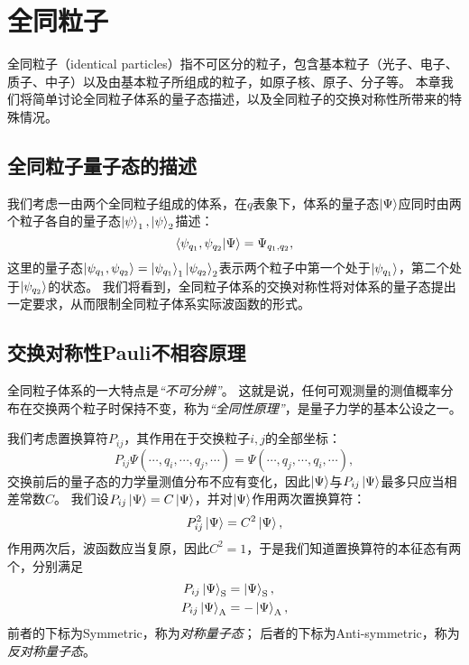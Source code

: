 
\section{全同粒子}
\label{sec:identical_particles}

全同粒子（identical particles）指不可区分的粒子，包含基本粒子（光子、电子、质子、中子）以及由基本粒子所组成的粒子，如原子核、原子、分子等。
本章我们将简单讨论全同粒子体系的量子态描述，以及全同粒子的交换对称性所带来的特殊情况。

\subsection{全同粒子量子态的描述}
\label{subsec:ip_state_desc}

我们考虑一由两个全同粒子组成的体系，在$q$表象下，体系的量子态$\ket{\Psi}$应同时由两个粒子各自的量子态$\ket{\psi}_1,\ket{\psi}_2$描述：
\begin{equation}
    \braket{\psi_{q_1},\psi_{q_2}}{\Psi} = \Psi_{q_1, q_2},
\end{equation}
这里的量子态$\ket{\psi_{q_1},\psi_{q_2}}=\ket{\psi_{q_1}}_1 \ket{\psi_{q_2}}_2$表示两个粒子中第一个处于$\ket{\psi_{q_1}}$，第二个处于$\ket{\psi_{q_2}}$的状态。
我们将看到，全同粒子体系的交换对称性将对体系的量子态提出一定要求，从而限制全同粒子体系实际波函数的形式。

\subsection{\texorpdfstring{交换对称性\quad Pauli不相容原理}{交换对称性  Pauli不相容原理}}
\label{subsec:ip_sym}

\begin{tcolorbox}
    全同粒子体系的一大特点是\emph{“不可分辨”}。
    这就是说，任何可观测量的测值概率分布在交换两个粒子时保持不变，称为\emph{“全同性原理”}，是量子力学的基本公设之一。
\end{tcolorbox}

我们考虑置换算符$P_{ij}$，其作用在于交换粒子$i,j$的全部坐标：
\begin{equation}
    P_{ij}\Psi(\cdots,q_i,\cdots,q_j,\cdots) = \Psi(\cdots,q_j,\cdots,q_i,\cdots),
\end{equation}
交换前后的量子态的力学量测值分布不应有变化，因此$\ket{\Psi}$与$P_{ij}\ket{\Psi}$最多只应当相差常数$C$。
我们设$P_{ij}\ket{\Psi}=C\ket{\Psi}$，并对$\ket{\Psi}$作用两次置换算符：
\begin{equation}
    P_{ij}^2\ket{\Psi} = C^2 \ket{\Psi},
\end{equation}
作用两次后，波函数应当复原，因此$C^2=1$，于是我们知道置换算符的本征态有两个，分别满足
\begin{equation}
\begin{aligned}
    P_{ij}\ket{\Psi}_{\mathrm{S}} &=  \ket{\Psi}_{\mathrm{S}}, \\
    P_{ij}\ket{\Psi}_{\mathrm{A}} &= -\ket{\Psi}_{\mathrm{A}}, \\
\end{aligned}
\end{equation}
前者的下标为Symmetric，称为\emph{对称量子态}；
后者的下标为Anti-symmetric，称为\emph{反对称量子态}。

